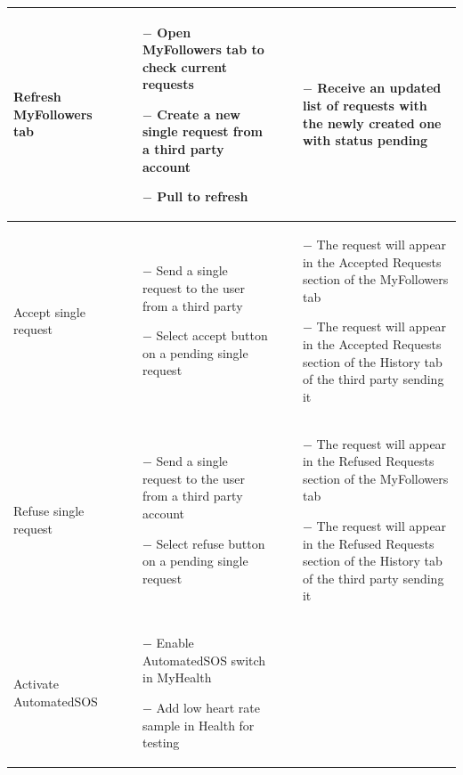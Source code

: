\documentclass[titlepage]{article}
\begin{document}
\begin{longtable}{| p{3 cm} | p{4 cm} | p{4 cm} |}
		Refresh MyFollowers tab & \begin{itemize}[nolistsep]
			\item[$-$] Open MyFollowers tab to check current requests
			\item[$-$] Create a new single request from a third party account
			\item[$-$] Pull to refresh 
		\end{itemize}
		& \begin{itemize}[nolistsep]
			\item[$-$] Receive an updated list of requests with the newly created one with status pending
		\end{itemize} \\ \hline
		Accept single request & \begin{itemize}[nolistsep]
			\item[$-$] Send a single request to the user from a third party
			\item[$-$] Select accept button on a pending single request
		\end{itemize}
		& \begin{itemize}[nolistsep]
			\item[$-$] The request will appear in the Accepted Requests section of the MyFollowers tab
			\item[$-$] The request will appear in the Accepted Requests section of the History tab of the third party sending it
		\end{itemize} \\ \hline
		Refuse single request & \begin{itemize}[nolistsep]
			\item[$-$] Send a single request to the user from a third party account
			\item[$-$] Select refuse button on a pending single request
		\end{itemize}
		& \begin{itemize}[nolistsep]
			\item[$-$] The request will appear in the Refused Requests section of the MyFollowers tab
			\item[$-$] The request will appear in the Refused Requests section of the History tab of the third party sending it
		\end{itemize} \\ \hline
		Activate AutomatedSOS & \begin{itemize}[nolistsep]
			\item[$-$] Enable AutomatedSOS switch in MyHealth
			\item[$-$] Add low heart rate sample in Health for testing

\end{itemize}
\end{longtable}
\end{document}
